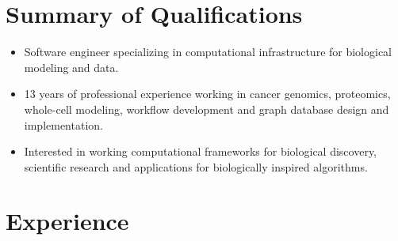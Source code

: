 \makecvtitle

\section{Summary of Qualifications}

\begin{itemize}
\item Software engineer specializing in computational infrastructure for biological modeling and data.
\item 13 years of professional experience working in cancer genomics, proteomics, whole-cell modeling, workflow development and graph database design and implementation.
\item Interested in working computational frameworks for biological discovery, scientific research and applications for biologically inspired algorithms. 
\end{itemize}

\section{Experience}





